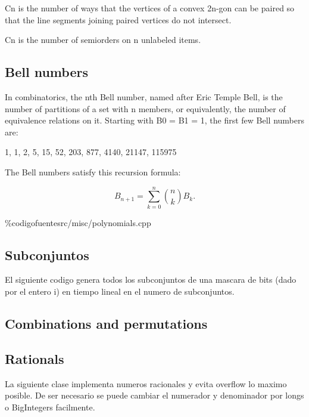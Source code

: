 \documentclass[10pt,letterpaper,twocolumn,twosided]{article}
\newcommand{\codigofuente}[1]{

\dotfill
}
\begin{document}
Cn is the number of ways that the vertices of a convex 2n-gon can be paired so that the line segments joining paired vertices do not intersect.

Cn is the number of semiorders on n unlabeled items.

\subsection{Bell numbers}

In combinatorics, the nth Bell number, named after Eric Temple Bell, is the number of partitions of a set with n members, or equivalently, the number of equivalence relations on it. Starting with B0 = B1 = 1, the first few Bell numbers are:

1, 1, 2, 5, 15, 52, 203, 877, 4140, 21147, 115975

The Bell numbers satisfy this recursion formula:

$$B_{n+1}=\sum_{k=0}^{n}{{n \choose k}B_k}.$$


\%codigofuente{src/misc/polynomials.cpp}

\subsection{Subconjuntos}

El siguiente codigo genera todos los subconjuntos de una mascara de bits (dado por el entero i) en tiempo lineal en el numero de subconjuntos.

\codigofuente{src/misc/subconjuntos.cpp}

\subsection{Combinations and permutations}

\codigofuente{src/misc/combiperm.cpp}

\subsection{Rationals}

La siguiente clase implementa numeros racionales y evita overflow lo maximo posible. De ser necesario se puede cambiar el numerador y denominador por longs o BigIntegers facilmente.
\end{document}
